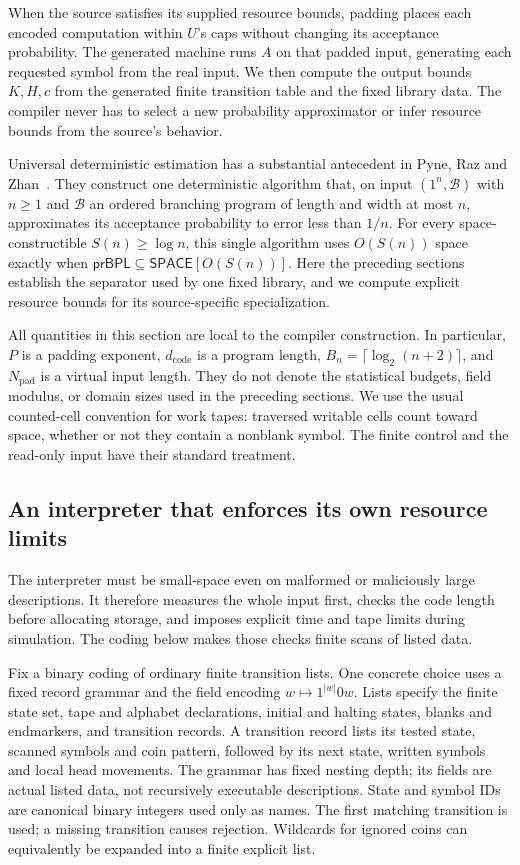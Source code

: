 When the source satisfies its supplied resource bounds, padding places
each encoded computation within $U$'s caps without changing its
acceptance probability. The generated machine runs $A$ on that padded input, generating each requested
symbol from the real input. We then compute the output bounds $K,H,c$
from the generated finite transition table and the fixed library data.
The compiler never has to select a new probability approximator or infer
resource bounds from the source's behavior.

Universal deterministic estimation has a substantial antecedent in
Pyne, Raz and Zhan~\cite[full version, Theorem~5.1]{PyneRazZhan2023}.
They construct one deterministic algorithm that, on input $(1^n,\mathcal B)$
with $n\ge1$ and $\mathcal B$ an ordered branching program of length
and width at most $n$, approximates its acceptance probability to error less than
$1/n$. For every space-constructible $S(n)\ge\log n$, this single
algorithm uses $O(S(n))$ space exactly when
$\mathsf{prBPL}\subseteq\mathsf{SPACE}[O(S(n))]$.
Here the preceding sections establish the separator used by one fixed
library, and we compute explicit resource bounds for its source-specific
specialization.

All quantities in this section are local to the compiler construction.
In particular, $P$ is a padding exponent, $d_{\mathrm{code}}$ is a program
length, $B_n=\lceil\log_2(n+2)\rceil$, and $N_{\mathrm{pad}}$ is a virtual
input length.  They do not denote the statistical budgets, field modulus,
or domain sizes used in the preceding sections.  We use the usual
counted-cell convention for work tapes: traversed writable cells count
toward space, whether or not they contain a nonblank symbol.  The finite
control and the read-only input have their standard treatment.

\subsection{An interpreter that enforces its own resource limits}
\label{subsec:compiler-interpreter}

The interpreter must be small-space even on malformed or maliciously large descriptions. It therefore measures the whole input first, checks the code length before allocating storage, and imposes explicit time and tape limits during simulation. The coding below makes those checks finite scans of listed data.

Fix a binary coding of ordinary finite transition lists.  One concrete
choice uses a fixed record grammar and the field encoding
$w\mapsto 1^{|w|}0w$.  Lists specify the finite state set, tape and
alphabet declarations, initial and halting states, blanks and endmarkers,
and transition records.  A transition record lists its tested state,
scanned symbols and coin pattern, followed by its next state, written
symbols and local head movements.  The grammar has fixed nesting depth;
its fields are actual listed data, not recursively executable descriptions.
State and symbol IDs are canonical binary integers used only as names.
The first matching transition is
used; a missing transition causes rejection.  Wildcards for ignored coins
can equivalently be expanded into a finite explicit list.

